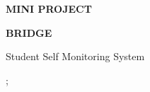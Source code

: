 \documentclass[12pt,b5paper]{report}
\begin{document}

\vspace*{\fill}

\begin{center}

\Large{\bfseries{MINI PROJECT}}

\vspace{2.5in}

\huge{\bfseries{BRIDGE}}

\large{Student Self Monitoring System}

\vspace{2.5in}

;

\end{center}

\vspace*{\fill}
\end{document}
